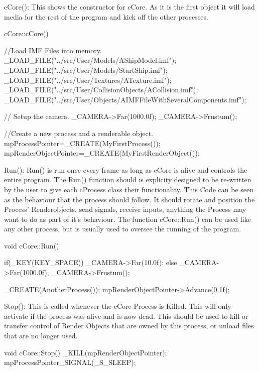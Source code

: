 cCore(): This shows the constructor for cCore. As it is the first object it will load media for the rest of the program and kick off the other processes. 
\begin{DoxyCode}
 cCore::cCore()
 {
 //Load IMF Files into memory.
  _LOAD_FILE("../src/User/Models/AShipModel.imf");
  _LOAD_FILE("../src/User/Models/StartShip.imf");
  _LOAD_FILE("../src/User/Textures/ATexture.imf");
  _LOAD_FILE("../src/User/CollisionObjects/ACollision.imf");
  _LOAD_FILE("../src/User/Objects/AIMFFileWithSeveralComponents.imf");

 // Setup the camera.
  _CAMERA->Far(1000.0f);
  _CAMERA->Frustum();

 //Create a new process and a renderable object.
  mpProcessPointer=_CREATE(MyFirstProcess());
  mpRenderObjectPointer=_CREATE(MyFirstRenderObject());

 }
\end{DoxyCode}


Run(): Run() is run once every frame as long as cCore is alive and controls the entire program. The Run() function should is explicity designed to be re-\/written by the user to give each \hyperlink{classc_process}{cProcess} class their functionality. This Code can be seen as the behaviour that the process should follow. It should rotate and position the Process' Renderobjects, send signals, receive inputs, anything the Process may want to do as part of it's behaviour. The function cCore::Run() can be used like any other process, but is usually used to oversee the running of the program. 
\begin{DoxyCode}
 void cCore::Run()
 {

  if(_KEY(KEY_SPACE)) _CAMERA->Far(10.0f);
   else _CAMERA->Far(1000.0f);
  _CAMERA->Frustum();

  _CREATE(AnotherProcess());
  mpRenderObjectPointer->Advance(0.1f);

 }
\end{DoxyCode}


Stop(): This is called whenever the cCore Process is Killed. This will only activate if the process was alive and is now dead. This should be used to kill or transfer control of Render Objects that are owned by this process, or unload files that are no longer used.


\begin{DoxyCode}
 void cCore::Stop()
 {
 _KILL(mpRenderObjectPointer);
 mpProcessPointer_SIGNAL(_S_SLEEP);
 }
\end{DoxyCode}


